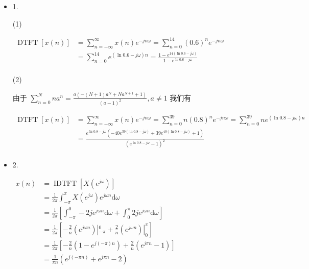 \documentclass[a4paper,UTF8]{article}
\numberwithin{equation}{section}
\begin{document}
	\begin{framed}
		\begin{spacing}{1.5}
			\begin{itemize}
        \item 1.

        (1)
        
        $
        \begin{aligned}
        \operatorname{DTFT}[x(n)] & = \sum_{n=-\infty}^{\infty}x(n)e^{-jn\omega} = \sum_{n=0}^{14}(0.6)^{n}e^{-jn\omega}  \\
        & = \sum_{n=0}^{14}e^{(\ln 0.6-j\omega)n} = \frac{1-e^{14(\ln 0.6-j\omega)}}{1 - e^{\ln 0.6-j\omega}}  \\
        \end{aligned}
        $
        
        (2)
        
        由于 $\displaystyle \sum_{n=0}^{N}n a^{n} = \frac{a (- (N+1) a^{N} + N a^{N + 1} + 1)}{(a - 1)^{2}}, a \neq 1$ 我们有
        
        $
        \begin{aligned}
        \operatorname{DTFT}[x(n)] & = \sum_{n=-\infty}^{\infty}x(n)e^{-jn\omega} = \sum_{n=0}^{39}n(0.8)^{n}e^{-jn\omega} = \sum_{n=0}^{39}ne^{(\ln 0.8-j\omega)n}  \\
        &= \frac{e^{\ln 0.8-j\omega} (- 40 e^{39(\ln 0.8-j\omega)} + 39 e^{40(\ln 0.8-j\omega)} + 1)}{(e^{\ln 0.8-j\omega} - 1)^{2}}  \\
        \end{aligned}
        $
        
        \item 2.
        
        $
        \begin{aligned}
        x(n) &= \operatorname{IDTFT}[X(e^{j\omega})]  \\
        &= \frac{1}{2\pi}\int_{-\pi}^{\pi}X(e^{j\omega})e^{j\omega n}\mathrm{d}\omega  \\
        &= \frac{1}{2\pi}[\int_{-\pi}^{0}-2j e^{j\omega n}\mathrm{d}\omega + \int_{0}^{\pi}2j e^{j\omega n}\mathrm{d}\omega]  \\
        &= \frac{1}{2\pi}[-\frac{2}{n}(e^{j\omega n})|_{-\pi}^{0} + \frac{2}{n} (e^{j\omega n})|_{0}^{\pi}]  \\
        &= \frac{1}{2\pi}[-\frac{2}{n}(1 - e^{j(-\pi) n}) + \frac{2}{n} (e^{j \pi n} - 1)]  \\
        &= \frac{1}{\pi n}(e^{j (-\pi n)} + e^{j \pi n} - 2)  \\
        \end{aligned}
        $
			\end{itemize}
		\end{spacing}
	\end{framed}
	
\end{document}
